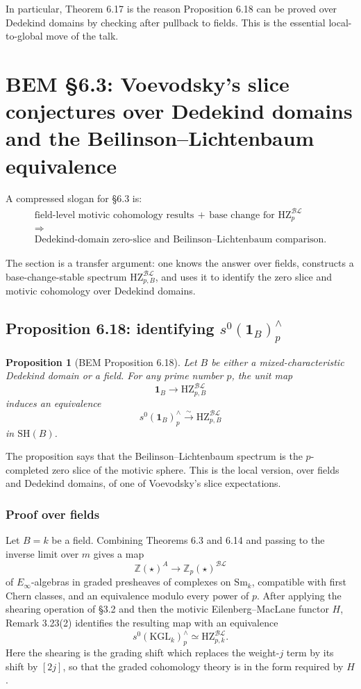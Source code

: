 \documentclass[11pt,a4paper]{article}
\newcommand{\Z}{\mathbb Z}
\newcommand{\SH}{\mathrm{SH}}
\newcommand{\Sm}{\mathrm{Sm}}
\newcommand{\BL}{\mathcal{BL}}
\newcommand{\KGL}{\mathrm{KGL}}
\newcommand{\HZ}{\mathrm{HZ}}
\newcommand{\1}{\mathbf 1}
\theoremstyle{bemstyle}
\newtheorem{proposition}[theorem]{Proposition}
\theoremstyle{definition}
\begin{document}
In particular, Theorem 6.17 is the reason Proposition 6.18 can be proved over Dedekind domains by checking after pullback to fields. This is the essential local-to-global move of the talk.


\clearpage
\section{BEM \S6.3: Voevodsky's slice conjectures over Dedekind domains and the Beilinson--Lichtenbaum equivalence}

A compressed slogan for \S6.3 is:
\[
\boxed{
\begin{gathered}
\text{field-level motivic cohomology results}\,+\,\text{base change for }\HZ^{\BL}_{p}
\\
\Longrightarrow
\\
\text{Dedekind-domain zero-slice and Beilinson--Lichtenbaum comparison.}
\end{gathered}}
\]

The section is a transfer argument: one knows the answer over fields, constructs a base-change-stable spectrum \(\HZ^{\BL}_{p,B}\), and uses it to identify the zero slice and motivic cohomology over Dedekind domains.


\subsection{Proposition 6.18: identifying \texorpdfstring{\(s^0(\1_B)^{\wedge}_p\)}{s0(1B) with HZBL}}

\begin{proposition}[BEM Proposition 6.18]
Let \(B\) be either a mixed-characteristic Dedekind domain or a field. For any prime number \(p\), the unit map
\[
       \1_B\longrightarrow \HZ^{\BL}_{p,B}
\]
induces an equivalence
\[
       s^0(\1_B)^{\wedge}_p \xrightarrow{\sim} \HZ^{\BL}_{p,B}
\]
in \(\SH(B)\).
\end{proposition}

The proposition says that the Beilinson--Lichtenbaum spectrum is the \(p\)-completed zero slice of the motivic sphere. This is the local version, over fields and Dedekind domains, of one of Voevodsky's slice expectations.


\subsubsection{Proof over fields}

Let \(B=k\) be a field. Combining Theorems 6.3 and 6.14 and passing to the inverse limit over \(m\) gives a map
\[
       \Z(\star)^A \longrightarrow \Z_p(\star)^{\BL}
\]
of \(E_\infty\)-algebras in graded presheaves of complexes on \(\Sm_k\), compatible with first Chern classes, and an equivalence modulo every power of \(p\). After applying the shearing operation of \S3.2 and then the motivic Eilenberg--MacLane functor \(H\), Remark 3.23(2) identifies the resulting map with an equivalence
\[
       s^0(\KGL_k)^{\wedge}_p \simeq \HZ^{\BL}_{p,k}.
\]
Here the shearing is the grading shift which replaces the weight-\(j\) term by its shift by \([2j]\), so that the graded cohomology theory is in the form required by \(H\).
\end{document}
